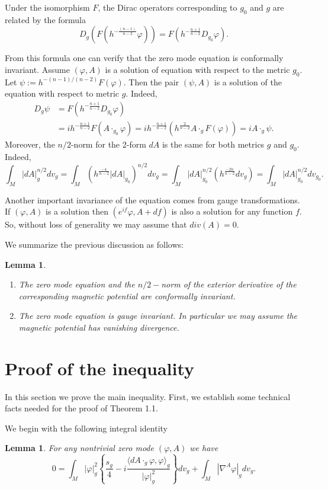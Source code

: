 \documentclass[11pt]{amsart}
\theoremstyle{plain}
\newtheorem{lemma}[theorem]{Lemma}
\numberwithin{equation}{section}
\theoremstyle{plain}
\begin{document}
Under the isomorphism $F$, the Dirac operators corresponding to $g_0$ and $g$ are related by the formula
$$D_g(F(h^{-\frac{(n-1)}{n-2}}\varphi))=F(h^{-\frac{n+1}{n-2}}D_{g_0}\varphi) .$$

From this formula one can verify that the zero mode equation is conformally invariant. Assume $(\varphi,A)$ is a solution of equation with respect to the metric $g_0$.
Let $\psi:=h^{-(n-1)/(n-2)}F(\varphi)$. Then the pair $(\psi,A)$ is a solution of the equation with respect to metric $g$. Indeed,
\begin{align*}
D_g\psi&=F(h^{-\frac{n+1}{n-2}}D_{g_0}\varphi)\\
&=ih^{-\frac{n+1}{n-2}}F(A\cdot_{g_0}\varphi)=ih^{-\frac{n+1}{n-2}}\left(h^{\frac{2}{n-2}}A\cdot_gF(\varphi)\right)=iA\cdot_g\psi.
\end{align*}
Moreover, the $n/2$-norm for the 2-form $dA$ is the same for both metrics $g$ and $g_0$. Indeed, $$\int_M|dA|_g^{n/2}dv_g=\int_M\left(h^{\frac{-4}{n-2}}|dA|_{g_0}\right)^{n/2}dv_g=\int_M|dA|_{g_0}^{n/2}(h^{\frac{-2n}{n-2}}dv_g)=\int_M|dA|_{g_0}^{n/2}dv_{g_0}.$$

Another important invariance of the equation comes from gauge transformations. If $(\varphi,A)$ is a solution then $(e^{if}\varphi,A+df)$ is also a solution for any function $f$. So, without loss of generality we may assume that $div(A)=0$.

We summarize the previous discussion as follows:
\begin{lemma}
\begin{enumerate}
\item[(1)]The zero mode equation and the $n/2-$norm of the exterior derivative of the corresponding magnetic potential are conformally invariant.
\item[(2)]The zero mode equation is gauge invariant. In particular we may assume the magnetic potential  has vanishing  divergence.
\end{enumerate}
\end{lemma}



\section{Proof of the inequality}
In this section we prove the main inequality.  First, we establish some technical facts needed for the proof of Theorem 1.1.

We begin with the following integral identity

\begin{lemma}
For any nontrivial zero mode $(\varphi,A)$ we have
\begin{equation}\label{integral1}
0=\int_M|\varphi|_g^2\left\lbrace\frac{s_g}{4}-i\frac{\langle dA\cdot_g\varphi,\varphi\rangle_g}{|\varphi|_g^2}\right\rbrace dv_g+\int_M|\nabla^A \varphi|_gdv_g. 
\end{equation}


\end{lemma}
 
\end{document}
